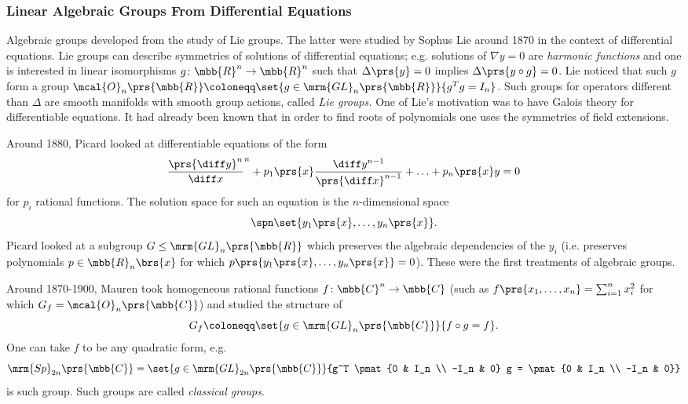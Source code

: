 \documentclass[10pt,a4paper,twoside,openany,hidelinks]{book}
\begin{document}
\subsubsection{Linear Algebraic Groups From Differential Equations}

Algebraic groups developed from the study of Lie groups. The latter were studied by Sophus Lie around 1870 in the context of differential equations. Lie groups can describe symmetries of solutions of differential equations; e.g. solutions of $\nabla y = 0$ are \emph{harmonic functions} and one is interested in linear isomorphisms $g \colon \mbb{R}^n \to \mbb{R}^n$ such that $\Delta\prs{y} = 0$ implies $\Delta\prs{y \circ g} = 0$. Lie noticed that such $g$ form a group $\mcal{O}_n\prs{\mbb{R}} \coloneqq \set{g \in \mrm{GL}_n\prs{\mbb{R}}}{g^T g = I_n}$.
Such groups for operators different than $\Delta$ are smooth manifolds with smooth group actions, called \emph{Lie groups.}
One of Lie's motivation was to have Galois theory for differentiable equations. It had already been known that in order to find roots of polynomials one uses the symmetries of field extensions.

Around 1880, Picard looked at differentiable equations of the form
\begin{align*}
\frac{\prs{\diff y}^n}{\diff x}^n + p_1\prs{x} \frac{\diff y^{n-1}}{\prs{\diff x}^{n-1}} + \ldots + p_n\prs{x} y = 0
\end{align*}
for $p_i$ rational functions.
The solution space for such an equation is the $n$-dimensional space
\[\spn\set{y_1\prs{x}, \ldots, y_n\prs{x}} \text{.}\]
Picard looked at a subgroup $G \leq \mrm{GL}_n\prs{\mbb{R}}$
which preserves the algebraic dependencies of the $y_i$ (i.e. preserves polynomials $p \in \mbb{R}_n\brs{x}$ for which $p\prs{y_1\prs{x}, \ldots, y_n\prs{x}} = 0$). These were the first treatments of algebraic groups.

Around 1870-1900, Mauren took homogeneous rational functions $f \colon \mbb{C}^n \to \mbb{C}$ (such as $f\prs{x_1, \ldots, x_n} = \sum_{i=1}^n x_i^2$ for which $G_f = \mcal{O}_n\prs{\mbb{C}}$) and studied the structure of
\[G_f \coloneqq \set{g \in \mrm{GL}_n\prs{\mbb{C}}}{f \circ g = f} \text{.}\]
One can take $f$ to be any quadratic form, e.g.
\[\mrm{Sp}_{2n}\prs{\mbb{C}} = \set{g \in \mrm{GL}_{2n}\prs{\mbb{C}}}{g^T \pmat{0 & I_n \\ -I_n & 0} g = \pmat{0 & I_n \\ -I_n & 0}}\]
is such  group.
Such groups are called \emph{classical groups}.
\end{document}
